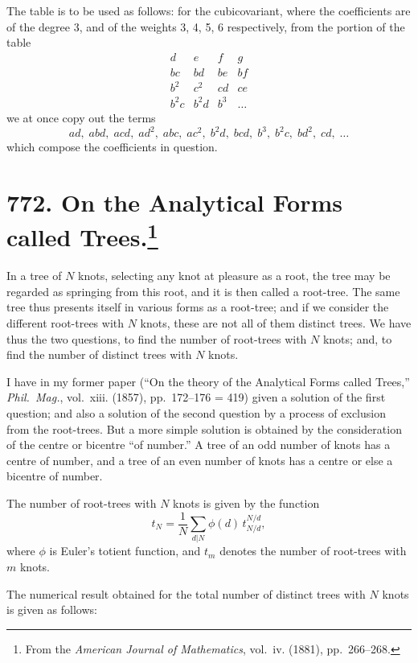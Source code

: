 \documentclass[11pt,a4paper]{article}
\theoremstyle{definition}
\begin{document}
The table is to be used as follows: for the cubicovariant, where the coefficients are of the degree 3, and of the weights 3, 4, 5, 6 respectively, from the portion of the table
\[
\begin{array}{cccc}
d & e & f & g \\
bc & bd & be & bf \\
b^2 & c^2 & cd & ce \\
b^2c & b^2d & b^3 & \dots
\end{array}
\]
we at once copy out the terms
\[
ad,\; abd,\; acd,\; ad^2,\; abc,\; ac^2,\; b^2d,\; bcd,\; b^3,\; b^2c,\; bd^2,\; cd,\; \dots
\]
which compose the coefficients in question.

\newpage
\section[On the Analytical Forms called Trees]{772. On the Analytical Forms called Trees.\footnote{From the \textit{American Journal of Mathematics}, vol.~iv. (1881), pp.~266--268.}}

In a tree of $N$ knots, selecting any knot at pleasure as a root, the tree may be regarded as springing from this root, and it is then called a root-tree. The same tree thus presents itself in various forms as a root-tree; and if we consider the different root-trees with $N$ knots, these are not all of them distinct trees. We have thus the two questions, to find the number of root-trees with $N$ knots; and, to find the number of distinct trees with $N$ knots.

I have in my former paper (``On the theory of the Analytical Forms called Trees,'' \textit{Phil.~Mag.}, vol.~xiii. (1857), pp.~172--176 = 419) given a solution of the first question; and also a solution of the second question by a process of exclusion from the root-trees. But a more simple solution is obtained by the consideration of the centre or bicentre ``of number.'' A tree of an odd number of knots has a centre of number, and a tree of an even number of knots has a centre or else a bicentre of number.

The number of root-trees with $N$ knots is given by the function
\[
t_N = \frac{1}{N}\sum_{d|N} \phi(d)\, t_{N/d}^{N/d},
\]
where $\phi$ is Euler's totient function, and $t_m$ denotes the number of root-trees with $m$ knots.

The numerical result obtained for the total number of distinct trees with $N$ knots is given as follows:
\end{document}
